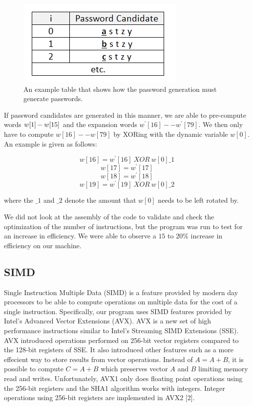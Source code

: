 \documentclass[letterpaper, 10 pt, conference]{ieeeconf}  %
\begin{document}
\begin{figure}[thpb]
	\centering
	\includegraphics[scale=.75]{passwordGeneration}
    \caption{An example table that shows how the password generation must generate passwords.}
\end{figure}

If password candidates are generated in this manner, we are able to pre-compute words $w[1]\--w[15]$ and the expansion words $w^{'}[16]--w^{'}[79]$.  We then only have to compute $w[16]--w[79]$ by XORing with the dynamic variable $w[0]$.  An example is given as follows:


$$w[16] = w^{'}[16]\ XOR\ w[0]\_1$$
$$w[17] = w^{'}[17]$$
$$w[18] = w^{'}[18]$$
$$w[19] = w^{'}[19]\ XOR\ w[0]\_2$$

\noindent
where the $\_1$ and $\_2$ denote the amount that $w[0]$ needs to be left rotated by.

We did not look at the assembly of the code to validate and check the  optimization of the number of instructions, but the program was run to test for an increase in efficiency.  We were able to observe a $15$ to $20\%$ increase in efficiency on our machine.
   
\subsection{SIMD}

Single Instruction Multiple Data (SIMD) is a feature provided by modern day processors to be able to compute operations on multiple data for the cost of a single instruction.  Specifically, our program uses SIMD features provided by Intel's Advanced Vector Extensions (AVX). AVX is a new set of high performance instructions similar to Intel's Streaming SIMD Extensions (SSE).  AVX introduced operations performed on 256-bit vector registers compared to the 128-bit registers of SSE.  It also introduced other features such as a more effecient way to store results from vector operations.  Instead of $A = A + B$, it is possible to compute $C = A + B$ which preserves vector $A$ and $B$ limiting memory read and writes.  Unfortunately, AVX1 only does floating point operations using the 256-bit registers and the SHA1 algorithm works with integers.  Integer operations using 256-bit registers are implemented in AVX2 [2].
\end{document}
